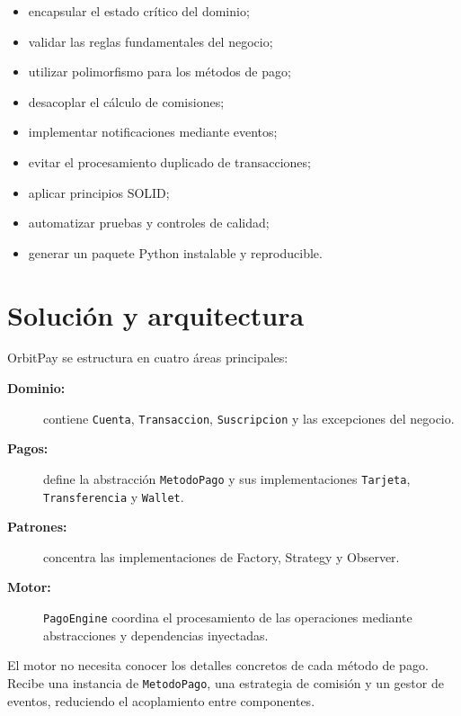 \documentclass[11pt,a4paper]{article}
\begin{document}
\begin{itemize}
    \item encapsular el estado crítico del dominio;
    \item validar las reglas fundamentales del negocio;
    \item utilizar polimorfismo para los métodos de pago;
    \item desacoplar el cálculo de comisiones;
    \item implementar notificaciones mediante eventos;
    \item evitar el procesamiento duplicado de transacciones;
    \item aplicar principios SOLID;
    \item automatizar pruebas y controles de calidad;
    \item generar un paquete Python instalable y reproducible.
\end{itemize}

\section{Solución y arquitectura}

OrbitPay se estructura en cuatro áreas principales:

\begin{description}
    \item[\textbf{Dominio:}]
    contiene \texttt{Cuenta}, \texttt{Transaccion},
    \texttt{Suscripcion} y las excepciones del negocio.

    \item[\textbf{Pagos:}]
    define la abstracción \texttt{MetodoPago} y sus
    implementaciones \texttt{Tarjeta},
    \texttt{Transferencia} y \texttt{Wallet}.

    \item[\textbf{Patrones:}]
    concentra las implementaciones de Factory,
    Strategy y Observer.

    \item[\textbf{Motor:}]
    \texttt{PagoEngine} coordina el procesamiento de las
    operaciones mediante abstracciones y dependencias
    inyectadas.
\end{description}

El motor no necesita conocer los detalles concretos de cada
método de pago. Recibe una instancia de \texttt{MetodoPago},
una estrategia de comisión y un gestor de eventos, reduciendo
el acoplamiento entre componentes.
\end{document}
